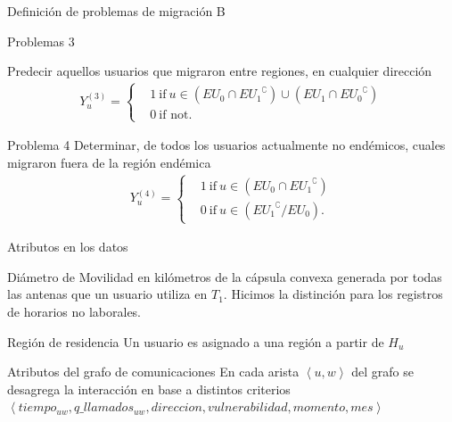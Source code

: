 \documentclass[xcolor=x11names]{beamer}
\begin{document}
\begin{frame}{Definición de problemas de migración B}
	\begin{block}{Problemas 3}

		Predecir aquellos usuarios que migraron entre regiones, en cualquier dirección
		\begin{align*}
			Y^{(3)}_u =
			\begin{cases}
				&1 \ \mbox{if} \ u \in (EU_{0} \cap { EU_{1} }^{\complement}) \cup (EU_{1} \cap { EU_{0} }^{\complement}) \\
				&0 \ \mbox{if not}.
			\end{cases}
		\end{align*}
	\end{block}

	\begin{block}{Problema 4}
		Determinar, de todos los usuarios actualmente no endémicos, cuales migraron fuera de la región endémica
		\begin{align*}
			Y^{(4)}_u =
			\begin{cases}
				& 1 \ \mbox{if} \ u \in ( EU_{0} \cap { EU_{1} }^{\complement})    \\
				& 0 \ \mbox{if} \ u \in ( { EU_{1} }^{\complement} / EU_{0}).
			\end{cases}
		\end{align*}

	\end{block}

\end{frame}


\begin{frame}{Atributos en los datos}

	\begin{block}{Diámetro de Movilidad}
		en kilómetros de la cápsula convexa generada por todas las antenas que un usuario utiliza en $T_1$. Hicimos la distinción para los registros de horarios no laborales.
	\end{block}

	\begin{block}{Región de residencia}
	Un usuario es asignado a una región a partir de $H_u$
\end{block}


	\begin{block}{Atributos del grafo de comunicaciones}
		En cada arista $\left< u, w \right>$ del grafo se desagrega la interacción en base a distintos criterios
		$\left< tiempo_{uw}, q\_llamados_{uw}, direccion, vulnerabilidad, momento, mes \right>$
%
\end{block}


\end{frame}
\end{document}
